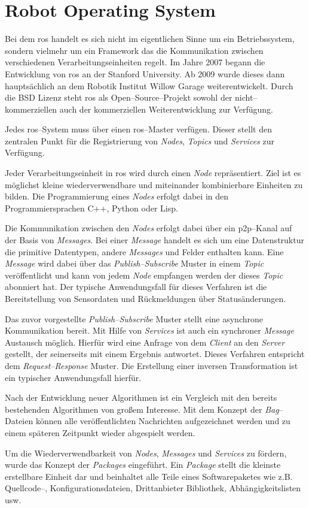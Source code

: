\section{Robot Operating System}

Bei dem \Gls{ros} handelt es sich nicht im eigentlichen Sinne um ein Betriebssystem, sondern vielmehr um ein Framework das die Kommunikation zwischen verschiedenen Verarbeitungseinheiten regelt. Im Jahre 2007 begann die Entwicklung von \Gls{ros} an der Stanford University. Ab 2009 wurde dieses dann hauptsächlich an dem Robotik Institut Willow Garage weiterentwickelt. Durch die BSD Lizenz steht \Gls{ros} als Open--Source--Projekt sowohl der nicht--kommerziellen auch der kommerziellen Weiterentwicklung zur Verfügung. \cite{quigley2009ros}

Jedes \Gls{ros}--System muss über einen \Gls{ros}--Master verfügen. Dieser stellt den zentralen Punkt für die Registrierung von \textit{Nodes}, \textit{Topics} und \textit{Services} zur Verfügung.

Jeder Verarbeitungseinheit in \Gls{ros} wird durch einen \textit{Node} repräsentiert. Ziel ist es möglichst kleine wiederverwendbare und miteinander kombinierbare Einheiten zu bilden. Die Programmierung eines \textit{Nodes} erfolgt dabei in den Programmiersprachen C++, Python oder Lisp.

Die Kommunikation zwischen den \textit{Nodes} erfolgt dabei über ein \Gls{p2p}--Kanal auf der Basis von \textit{Messages}. Bei einer \textit{Message} handelt es sich um eine Datenstruktur die primitive Datentypen, andere \textit{Messages} und Felder enthalten kann. Eine \textit{Message} wird dabei über das \textit{Publish--Subscribe} Muster in einem \textit{Topic} veröffentlicht und kann von jedem \textit{Node} empfangen werden der dieses \textit{Topic} abonniert hat. Der typische Anwendungsfall für dieses Verfahren ist die Bereitstellung von Sensordaten und Rückmeldungen über Statusänderungen.

Das zuvor vorgestellte \textit{Publish--Subscribe} Muster stellt eine asynchrone Kommunikation bereit. Mit Hilfe von \textit{Services} ist auch ein synchroner \textit{Message} Austausch möglich. Hierfür wird eine Anfrage von dem \textit{Client} an den \textit{Server} gestellt, der seinerseits mit einem Ergebnis antwortet. Dieses Verfahren entspricht dem \textit{Request--Response} Muster. Die Erstellung einer inversen Transformation ist ein typischer Anwendungsfall hierfür.

Nach der Entwicklung neuer Algorithmen ist ein Vergleich mit den bereits bestehenden Algorithmen von großem Interesse. Mit dem Konzept der \textit{Bag}--Dateien können alle veröffentlichten Nachrichten aufgezeichnet werden und zu einem späteren Zeitpunkt wieder abgespielt werden.

Um die Wiederverwendbarkeit von \textit{Nodes}, \textit{Messages} und \textit{Services} zu fördern, wurde das Konzept der \textit{Packages} eingeführt. Ein \textit{Package} stellt die kleinste erstellbare Einheit dar und beinhaltet alle Teile eines Softwarepaketes wie z.B. Quellcode--, Konfigurationsdateien, Drittanbieter Bibliothek, Abhängigkeitslisten usw.

